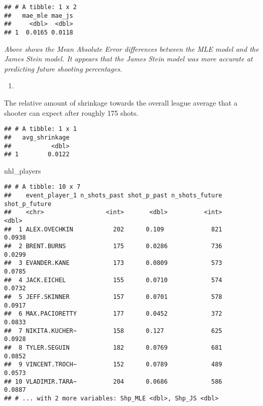 \documentclass[]{article}
\newenvironment{Shaded}{\begin{snugshade}}{\end{snugshade}}
\newcommand{\DataTypeTok}[1]{\textcolor[rgb]{0.13,0.29,0.53}{#1}}
\newcommand{\KeywordTok}[1]{\textcolor[rgb]{0.13,0.29,0.53}{\textbf{#1}}}
\newcommand{\NormalTok}[1]{#1}
\newcommand{\OperatorTok}[1]{\textcolor[rgb]{0.81,0.36,0.00}{\textbf{#1}}}
\newcommand{\StringTok}[1]{\textcolor[rgb]{0.31,0.60,0.02}{#1}}
\begin{document}
\begin{verbatim}
## # A tibble: 1 x 2
##   mae_mle mae_js
##     <dbl>  <dbl>
## 1  0.0165 0.0118
\end{verbatim}

\emph{Above shows the Mean Absolute Error differences between the MLE
model and the James Stein model. It appears that the James Stein model
was more accurate at predicting future shooting percentages.}

\begin{enumerate}
\def\labelenumi{\roman{enumi})}
\setcounter{enumi}{2}
\item
\end{enumerate}

The relative amount of shrinkage towards the overall league average that
a shooter can expect after roughly 175 shots.

\begin{Shaded}
\end{Shaded}

\begin{verbatim}
## # A tibble: 1 x 1
##   avg_shrinkage
##           <dbl>
## 1        0.0122
\end{verbatim}

\begin{Shaded}
\begin{Highlighting}[]
\NormalTok{nhl_players}
\end{Highlighting}
\end{Shaded}

\begin{verbatim}
## # A tibble: 10 x 7
##    event_player_1 n_shots_past shot_p_past n_shots_future shot_p_future
##    <chr>                 <int>       <dbl>          <int>         <dbl>
##  1 ALEX.OVECHKIN           202      0.109             821        0.0938
##  2 BRENT.BURNS             175      0.0286            736        0.0299
##  3 EVANDER.KANE            173      0.0809            573        0.0785
##  4 JACK.EICHEL             155      0.0710            574        0.0732
##  5 JEFF.SKINNER            157      0.0701            578        0.0917
##  6 MAX.PACIORETTY          177      0.0452            372        0.0833
##  7 NIKITA.KUCHER~          158      0.127             625        0.0928
##  8 TYLER.SEGUIN            182      0.0769            681        0.0852
##  9 VINCENT.TROCH~          152      0.0789            489        0.0573
## 10 VLADIMIR.TARA~          204      0.0686            586        0.0887
## # ... with 2 more variables: Shp_MLE <dbl>, Shp_JS <dbl>
\end{verbatim}
\end{document}
